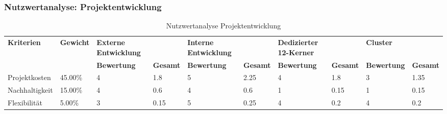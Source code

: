\subsubsection{Nutzwertanalyse: Projektentwicklung}
\begin{sidewaystable}
	\centering
	\caption{Nutzwertanalyse Projektentwicklung}
	\label{nwa:projektentwicklung}
	\begin{tabular}{llllllllll}
		\rowcolor[HTML]{9698ED}
		{\color[HTML]{FFFFFF} \textbf{Kriterien}} & {\color[HTML]{FFFFFF} \textbf{Gewicht}} & {\color[HTML]{FFFFFF} \textbf{Externe Entwicklung}} & {\color[HTML]{FFFFFF} \textbf{}}       & {\color[HTML]{FFFFFF} \textbf{Interne Entwicklung}} & {\color[HTML]{FFFFFF} \textbf{}}       & {\color[HTML]{FFFFFF} \textbf{Dedizierter 12-Kerner}} & {\color[HTML]{FFFFFF} \textbf{}}       & {\color[HTML]{FFFFFF} \textbf{Cluster}}   & {\color[HTML]{FFFFFF} \textbf{}}       \\
		\rowcolor[HTML]{9698ED}
		{\color[HTML]{FFFFFF} \textbf{}}          & {\color[HTML]{FFFFFF} \textbf{}}        & {\color[HTML]{FFFFFF} \textbf{Bewertung}}           & {\color[HTML]{FFFFFF} \textbf{Gesamt}} & {\color[HTML]{FFFFFF} \textbf{Bewertung}}           & {\color[HTML]{FFFFFF} \textbf{Gesamt}} & {\color[HTML]{FFFFFF} \textbf{Bewertung}}             & {\color[HTML]{FFFFFF} \textbf{Gesamt}} & {\color[HTML]{FFFFFF} \textbf{Bewertung}} & {\color[HTML]{FFFFFF} \textbf{Gesamt}} \\
		Projektkosten                             & 45.00\%                                 & 4                                                   & 1.8                                    & 5                                                   & 2.25                                   & 4                                                     & 1.8                                    & 3                                         & 1.35                                   \\
		\rowcolor[HTML]{BBDAFF}
		Nachhaltigkeit                            & 15.00\%                                 & 4                                                   & 0.6                                    & 4                                                   & 0.6                                    & 1                                                     & 0.15                                   & 1                                         & 0.15                                   \\
		Flexibilität                              & 5.00\%                                  & 3                                                   & 0.15                                   & 5                                                   & 0.25                                   & 4                                                     & 0.2                                    & 4                                         & 0.2                                    \\

\end{tabular}
\end{sidewaystable}
